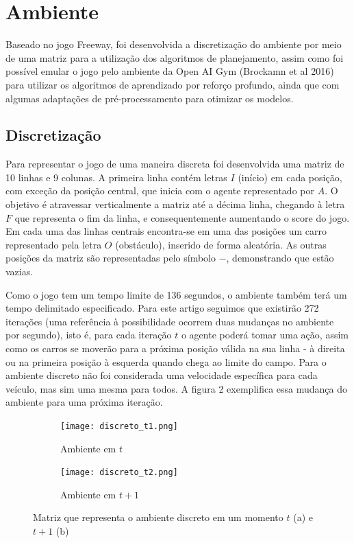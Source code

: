 \documentclass[letterpaper]{article} %
\begin{document}
\section{Ambiente}
Baseado no jogo Freeway, foi desenvolvida a discretização do ambiente por meio de uma matriz para a utilização dos algoritmos de planejamento, assim como foi possível emular o jogo pelo ambiente da Open AI Gym (Brockamn et al 2016) para utilizar os algoritmos de aprendizado por reforço profundo, ainda que com algumas adaptações de pré-processamento para otimizar os modelos.

\subsection{Discretização}
Para representar o jogo de uma maneira discreta foi desenvolvida uma matriz de 10 linhas e 9 colunas. A primeira linha contém letras $I$ (início) em cada posição, com exceção da posição central, que inicia com o agente representado por $A$. O objetivo é atravessar verticalmente a matriz até a décima linha, chegando à letra $F$ que representa o fim da linha, e consequentemente aumentando o score do jogo. Em cada uma das linhas centrais encontra-se em uma das posições um carro representado pela letra $O$ (obstáculo), inserido de forma aleatória. As outras posições da matriz são representadas pelo símbolo $-$, demonstrando que estão vazias. 

Como o jogo tem um tempo limite de 136 segundos, o ambiente também terá um tempo delimitado especificado. Para este artigo seguimos que existirão 272 iterações (uma referência à possibilidade ocorrem duas mudanças no ambiente por segundo), isto é, para cada iteração $t$ o agente poderá tomar uma ação, assim como os carros se moverão para a próxima posição válida na sua linha - à direita ou na primeira posição à esquerda quando chega ao limite do campo. Para o ambiente discreto não foi considerada uma velocidade específica para cada veículo, mas sim uma mesma para todos. A figura 2 exemplifica essa mudança do ambiente para uma próxima iteração.

\begin{figure}[h]
     \begin{subfigure}[h]{0.2\textwidth}
         \centering
         \texttt{[image: discreto\_t1.png]}
         \caption{Ambiente em $t$}
     \end{subfigure}
     \hfill
     \begin{subfigure}[h]{0.2\textwidth}
         \texttt{[image: discreto\_t2.png]}
         \caption{Ambiente em $t+1$}
     \end{subfigure}
        \caption{Matriz que representa o ambiente discreto em um momento $t$ (a) e $t+1$ (b)}
\end{figure}
\end{document}
